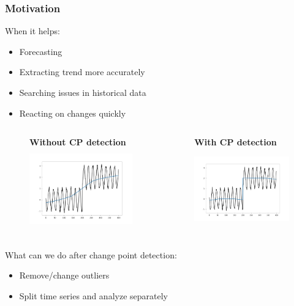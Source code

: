 \documentclass[intlimits, 9pt, unicode]{beamer}
\begin{document}
\begin{frame}
    \frametitle{Motivation}
When it helps:
    \begin{itemize}
    	\item Forecasting
	\item Extracting trend more accurately
    	\item Searching issues in historical data
	\item Reacting on changes quickly
    \end{itemize}


   \begin{columns}
        \begin{column}{5cm}
	\begin{figure}
		\textbf{Without CP detection}
		\includegraphics[height=3.5cm]{images/trend_fallacy}
	\end{figure}
        \end{column}

        \begin{column}{5cm}
	\begin{figure}
		\textbf{With CP detection}
		\includegraphics[height=3.5cm]{images/trend_succeed}
	\end{figure}
        \end{column}
    \end{columns}

What can we do after change point detection:
    \begin{itemize}
    	\item Remove/change outliers
	\item Split time series and analyze separately
    \end{itemize}

\end{frame}
\end{document}

